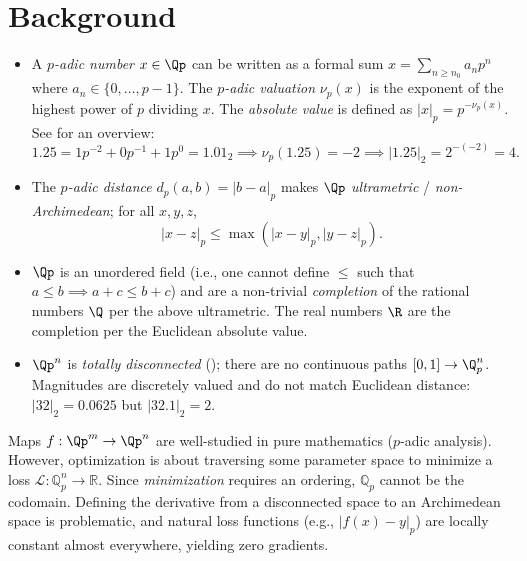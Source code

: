 \section{Background}
\label{sec:background}

\begin{itemize}
    \item A \textit{$p$-adic number} $x \in \Qp$ can be written as a formal sum $x = \sum_{n \ge n_0} a_n p^n$ where $a_n \in \{0,\dotsc, p-1\}$. The \textit{$p$-adic valuation} $\nu_p(x)$ is the exponent of the highest power of $p$ dividing $x$. The \textit{absolute value} is defined as $|x|_p = p^{-\nu_p(x)}$. See \citep{gouvea2020padic} for an overview:
    \begin{equation}
    1.25 = 1p^{-2} + 0p^{-1} + 1p^0 = 1.01_2 \implies \nu_p(1.25) = -2 \implies |1.25|_2 = 2^{-(-2)} = 4.
    \end{equation}
    \item The \textit{$p$-adic distance} $d_p(a,b) = |b - a|_p$ makes $\Qp$ \textit{ultrametric} / \textit{non-Archimedean}; for all $x,y,z$,
    \begin{equation}
    \label{eq:ultrametric}
    |x - z|_p \le \max(|x - y|_p, |y - z|_p).
    \end{equation}
    \item $\Qp$ is an unordered field (i.e., one cannot define $\le$ such that $a \le b \implies a + c \le b + c$) and are a non-trivial \textit{completion} of the rational numbers $\Q$ per the above ultrametric. The real numbers $\R$ are the completion per the Euclidean absolute value.
    \item $\Qp^n$ is \textit{totally disconnected} (); there are no continuous paths $[0, 1] \to \Q^n_p$. Magnitudes are discretely valued and do not match Euclidean distance: $|32|_2 = 0.0625$ but $|32.1|_2 = 2$.
\end{itemize}

\label{sec:related_work}

Maps $f: \Qp^m \to \Qp^n$ are well-studied in pure mathematics ($p$-adic analysis). However, optimization is about traversing some parameter space to minimize a loss $\mathcal{L}: \mathbb{Q}_p^n \to \mathbb{R}$. Since \textit{minimization} requires an ordering, $\mathbb{Q}_p$ cannot be the codomain. Defining the derivative from a disconnected space to an Archimedean space is problematic, and natural loss functions (e.g., $|f(x) - y|_p$) are locally constant almost everywhere, yielding zero gradients.

